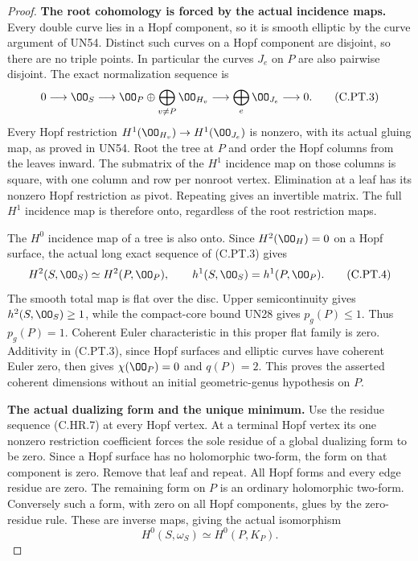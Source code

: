 \begin{proof}
\par\medskip\noindent\textbf{The root cohomology is forced by the actual incidence maps.}
Every double curve lies in a Hopf component, so it is smooth
elliptic by the curve argument of UN54. Distinct such curves
on a Hopf component are disjoint, so there are no triple
points. In particular the curves $J_e$ on $P$ are also
pairwise disjoint. The exact normalization sequence is
\[
 0\longrightarrow\OO_S
 \longrightarrow\OO_P\oplus\bigoplus_{v\ne P}\OO_{H_v}
 \longrightarrow\bigoplus_e\OO_{J_e}\longrightarrow0.
 \tag{C.PT.3}
\]
Every Hopf restriction $H^1(\OO_{H_v})\to H^1(\OO_{J_e})$
is nonzero, with its actual gluing map, as proved in UN54.
Root the tree at $P$ and order the Hopf columns from the
leaves inward. The submatrix of the $H^1$ incidence map
on those columns is square, with one column and row per
nonroot vertex. Elimination at a leaf has its nonzero
Hopf restriction as pivot. Repeating gives an invertible
matrix. The full $H^1$ incidence map is therefore onto,
regardless of the root restriction maps.

The $H^0$ incidence map of a tree is also onto. Since
$H^2(\OO_H)=0$ on a Hopf surface, the actual long exact
sequence of (C.PT.3) gives
\[
 H^2(S,\OO_S)\simeq H^2(P,\OO_P),\qquad
                 h^1(S,\OO_S)=h^1(P,\OO_P).
 \tag{C.PT.4}
\]
The smooth total map is flat over the disc. Upper
semicontinuity gives $h^2(S,\OO_S)\ge1$, while the
compact-core bound UN28 gives $p_g(P)\le1$. Thus
$p_g(P)=1$. Coherent Euler characteristic in this proper
flat family is zero. Additivity in (C.PT.3), since Hopf
surfaces and elliptic curves have coherent Euler zero,
then gives $\chi(\OO_P)=0$ and $q(P)=2$. This proves
the asserted coherent dimensions without an initial
geometric-genus hypothesis on $P$.

\par\medskip\noindent\textbf{The actual dualizing form and the unique minimum.}
Use the residue sequence (C.HR.7) at every Hopf vertex.
At a terminal Hopf vertex its one nonzero restriction
coefficient forces the sole residue of a global
dualizing form to be zero. Since a Hopf surface has no
holomorphic two-form, the form on that component is zero.
Remove that leaf and repeat. All Hopf forms and every
edge residue are zero. The remaining form on $P$ is
an ordinary holomorphic two-form. Conversely such a form,
with zero on all Hopf components, glues by the zero-residue
rule. These are inverse maps, giving the actual isomorphism
\[
                  H^0(S,\omega_S)\simeq H^0(P,K_P).
 \tag{C.PT.5}
\]


\end{proof}
